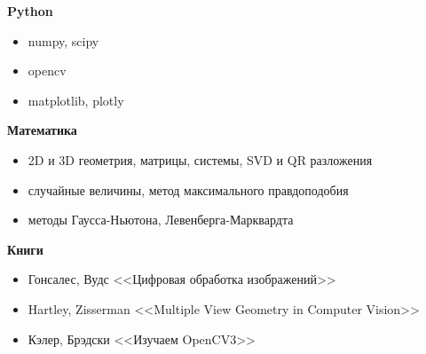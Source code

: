 \documentclass[
    12pt, 
    usepdftitle=false,
    aspectratio=1610
]{beamer}
\begin{document}
\begin{frame}

\textbf{Python}
\begin{itemize}
    \item numpy, scipy
    \item opencv
    \item matplotlib, plotly
\end{itemize}
\vspace{0.5cm}

\textbf{Математика}
\begin{itemize}
    \item 2D и 3D геометрия, матрицы, системы, SVD и QR разложения
    \item случайные величины, метод максимального правдоподобия
    \item методы Гаусса-Ньютона, Левенберга-Марквардта
\end{itemize}
\vspace{0.5cm}

\textbf{Книги}
\begin{itemize}
    \item Гонсалес, Вудс <<Цифровая обработка изображений>>
    \item Hartley, Zisserman <<Multiple View Geometry in Computer Vision>>
    \item Кэлер, Брэдски <<Изучаем OpenCV3>>
\end{itemize}
\end{frame}
\end{document}
